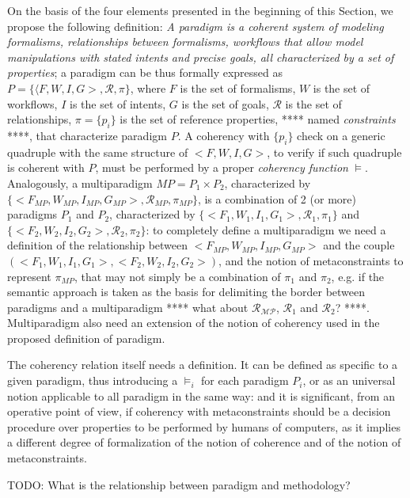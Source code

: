 On the basis of the four elements presented in the beginning of this Section, we propose the following definition: \textit{A paradigm is a coherent system of modeling formalisms, relationships between formalisms, workflows that allow model manipulations with stated intents and precise goals, all characterized by a set of properties}; a paradigm can be thus formally expressed as $P=\{\langle F,W,I,G>, \mathcal{R}, \pi \}$, where $F$ is the set of formalisms, $W$ is the set of workflows, $I$ is the set of intents, $G$ is the set of goals, $\mathcal{R}$ is the set of relationships, $\pi =\{p_i\}$ is the set of reference properties, **** named \textit{constraints} ****, that characterize paradigm $P$. A coherency with $\{p_i\}$ check on a generic quadruple with the same structure of $<F,W,I,G>$, to verify if such quadruple is coherent with $P$, must be performed by a proper \textit{coherency function} $\models$. Analogously, a multiparadigm $MP=P_1 \times P_2$, characterized by $\{<F_\mathit{MP},W_{MP},I_{MP},G_{MP}>, \mathcal{R}_{MP}, \pi_{MP}\}$, is a combination of 2 (or more) paradigms $P_1$ and $P_2$, characterized by $\{< F_1,W_1,I_1,G_1>, \mathcal{R}_1 , \pi_1\}$ and $\{<F_2,W_2,I_2,G_2>, \mathcal{R}_2, \pi_2\}$: to completely define a multiparadigm we need a definition of the relationship between $<F_{MP},W_{MP},I_{MP},G_{MP}>$ and the couple $(< F_1,W_1,I_1,G_1>,<F_2,W_2,I_2,G_2>)$, and the notion of metaconstraints to represent $\pi_{MP}$, that may not simply be a combination of $\pi_1$ and $\pi_2$, e.g. if the semantic approach is taken as the basis for delimiting the border between paradigms and a multiparadigm **** what about $\mathcal{R_{MP}}$, $\mathcal{R}_1$ and $\mathcal{R}_2$? ****. Multiparadigm also need an extension of the notion of coherency used in the proposed definition of paradigm.

The coherency relation itself needs a definition. It can be defined as specific to a given paradigm, thus introducing a $\models_i$ for each paradigm $P_i$, or as an universal notion applicable to all paradigm in the same way: and it is significant, from an operative point of view, if coherency with metaconstraints should be a decision procedure over properties to be performed by humans of computers, as it implies a different degree of formalization of the notion of coherence and of the notion of metaconstraints.

TODO: What is the relationship between paradigm and methodology?
